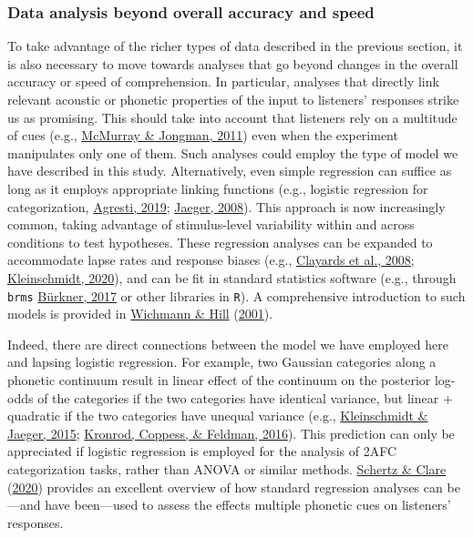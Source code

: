 \documentclass[
  11pt,
  english,
  man,floatsintext]{apa6}
\begin{document}
\hypertarget{data-analysis-beyond-overall-accuracy-and-speed}{%
\subsubsection{Data analysis beyond overall accuracy and speed}\label{data-analysis-beyond-overall-accuracy-and-speed}}

To take advantage of the richer types of data described in the previous section, it is also necessary to move towards analyses that go beyond changes in the overall accuracy or speed of comprehension. In particular, analyses that directly link relevant acoustic or phonetic properties of the input to listeners' responses strike us as promising. This should take into account that listeners rely on a multitude of cues (e.g., \protect\hyperlink{ref-mcmurray-jongman2011}{McMurray \& Jongman, 2011}) even when the experiment manipulates only one of them. Such analyses could employ the type of model we have described in this study. Alternatively, even simple regression can suffice as long as it employs appropriate linking functions (e.g., logistic regression for categorization, \protect\hyperlink{ref-agresti2019}{Agresti, 2019}; \protect\hyperlink{ref-jaeger2008}{Jaeger, 2008}). This approach is now increasingly common, taking advantage of stimulus-level variability within and across conditions to test hypotheses. These regression analyses can be expanded to accommodate lapse rates and response biases (e.g., \protect\hyperlink{ref-clayards2008}{Clayards et al., 2008}; \protect\hyperlink{ref-kleinschmidt2020}{Kleinschmidt, 2020}), and can be fit in standard statistics software (e.g., through \texttt{brms} \protect\hyperlink{ref-burkner2017}{Bürkner, 2017} or other libraries in \texttt{R}). A comprehensive introduction to such models is provided in \protect\hyperlink{ref-wichmann-hill2001}{Wichmann \& Hill} (\protect\hyperlink{ref-wichmann-hill2001}{2001}).

Indeed, there are direct connections between the model we have employed here and lapsing logistic regression. For example, two Gaussian categories along a phonetic continuum result in linear effect of the continuum on the posterior log-odds of the categories if the two categories have identical variance, but linear + quadratic if the two categories have unequal variance (e.g., \protect\hyperlink{ref-kleinschmidt-jaeger2015}{Kleinschmidt \& Jaeger, 2015}; \protect\hyperlink{ref-kronrod2016}{Kronrod, Coppess, \& Feldman, 2016}). This prediction can only be appreciated if logistic regression is employed for the analysis of 2AFC categorization tasks, rather than ANOVA or similar methods. \protect\hyperlink{ref-schertz-clare2020}{Schertz \& Clare} (\protect\hyperlink{ref-schertz-clare2020}{2020}) provides an excellent overview of how standard regression analyses can be---and have been---used to assess the effects multiple phonetic cues on listeners' responses.
\end{document}

